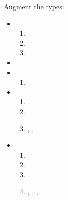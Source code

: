 Augment the types:
\begin{itemize}
\item {} 
  \begin{enumerate}
  \item {}
  \item {}
  \item {}
  \end{enumerate}

\item {}
\item {}
  \begin{enumerate}
  \item {}
  \end{enumerate}
\item {}
  \begin{enumerate}
  \item {}
  \item {}
  \item {}, , 
  \end{enumerate}

\item {}
  \begin{enumerate}
  \item {}
  \item {}
  \item {}
  \item {}, , , 
  \end{enumerate} 
\end{itemize}

